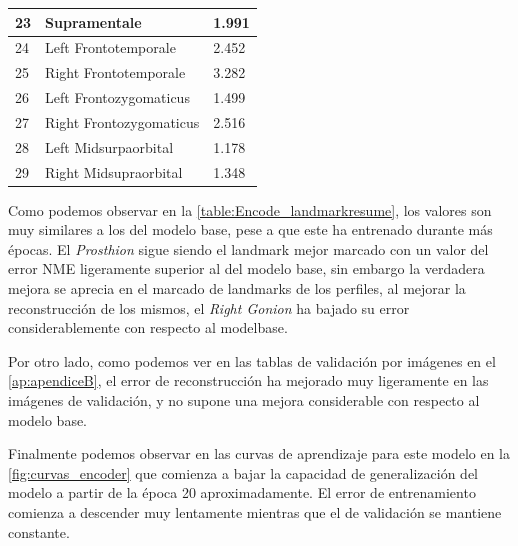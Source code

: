 \begin{table}[!ht]
\begin{tabular}{|l|l|l|}
                    23 & Supramentale & 1.991 \\ \hline
                    24 & Left Frontotemporale & 2.452 \\ \hline
                    25 & Right Frontotemporale & 3.282 \\ \hline
                    26 & Left Frontozygomaticus & 1.499 \\ \hline
                    27 & Right Frontozygomaticus & 2.516 \\ \hline
                    28 & Left Midsurpaorbital & 1.178 \\ \hline
                    29 & Right Midsupraorbital & 1.348 \\ \hline
                \end{tabular}
                \label{table:Encode_landmarkresume}
            \end{table}
        
        \noindent Como podemos observar en la \autoref{table:Encode_landmarkresume}, los valores son muy similares a los del modelo base, pese a que este ha entrenado durante más épocas. El \textit{Prosthion} sigue siendo el landmark mejor marcado con un valor del error NME ligeramente superior al del modelo base, sin embargo la verdadera mejora se aprecia en el marcado de landmarks de los perfiles, al mejorar la reconstrucción de los mismos, el \textit{Right Gonion} ha bajado su error considerablemente con respecto al modelbase.
        
        \medskip
        
        \noindent Por otro lado, como podemos ver en las tablas de validación por imágenes en el \autoref{ap:apendiceB}, el error de reconstrucción ha mejorado muy ligeramente en las imágenes de validación, y no supone una mejora considerable con respecto al modelo base. 

        \medskip

        \noindent Finalmente podemos observar en las curvas de aprendizaje para este modelo en la \autoref{fig:curvas_encoder} que comienza a bajar la capacidad de generalización del modelo a partir de la época 20 aproximadamente. El error de entrenamiento comienza a descender muy lentamente mientras que el de validación se mantiene constante.

